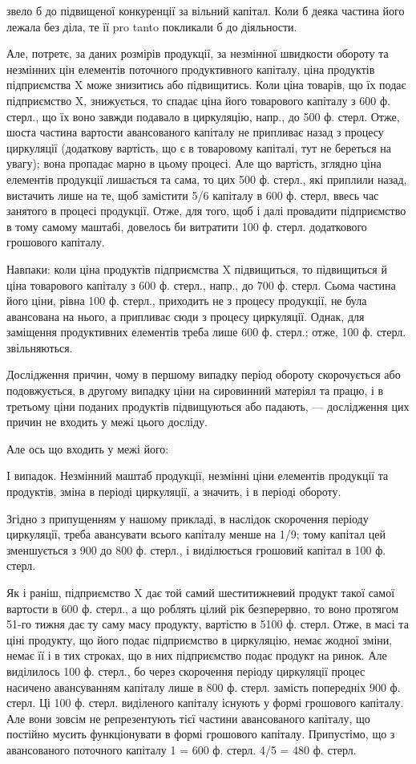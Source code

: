 звело б до підвищеної конкуренції за вільний капітал. Коли б деяка частина
його лежала без діла, те її pro tanto покликали б до діяльности.

Але, потретє, за даних розмірів продукції, за незмінної швидкости
обороту та незмінних цін елементів поточного продуктивного капіталу,
ціна продуктів підприємства X може знизитись або підвищитись. Коли
ціна товарів, що їх подає підприємство X, знижується, то спадає ціна
його товарового капіталу з 600 ф. стерл., що їх воно завжди подавало
в циркуляцію, напр., до 500 ф. стерл. Отже, шоста частина вартости авансованого
капіталу не припливає назад з процесу циркуляції (додаткову вартість,
що є в товаровому капіталі, тут не береться на увагу); вона пропадає
марно в цьому процесі. Але що вартість, зглядно ціна елементів продукції
лишається та сама, то цих 500 ф. стерл., які приплили назад, вистачить
лише на те, щоб замістити 5/6 капіталу в 600 ф. стерл, ввесь час
занятого в процесі продукції. Отже, для того, щоб і далі провадити підприємство
в тому самому маштабі, довелось би витратити 100 ф. стерл.
додаткового грошового капіталу.

Навпаки: коли ціна продуктів підприємства X підвищиться, то підвищиться
й ціна товарового капіталу з 600 ф. стерл., напр., до 700 ф.
стерл. Сьома частина його ціни, рівна 100 ф. стерл., приходить не з
процесу продукції, не була авансована на нього, а припливає сюди з
процесу циркуляції. Однак, для заміщення продуктивних елементів треба
лише 600 ф. стерл.; отже, 100 ф. стерл. звільняються.

Дослідження причин, чому в першому випадку період обороту
скорочується або подовжується, в другому випадку ціни на сировинний
матеріял та працю, і в третьому ціни поданих продуктів підвищуються
або падають, — дослідження цих причин не входить у межі цього досліду.

Але ось що входить у межі його:

I випадок. Незмінний маштаб продукції, незмінні ціни елементів
продукції та продуктів, зміна в періоді циркуляції, а значить, і в періоді
обороту.

Згідно з припущенням у нашому прикладі, в наслідок скорочення періоду
циркуляції, треба авансувати всього капіталу менше на 1/9; тому
капітал цей зменшується з 900 до 800 ф. стерл., і виділюється грошовий
капітал в 100 ф. стерл.

Як і раніш, підприємство X дає той самий шеститижневий продукт такої
самої вартости в 600 ф. стерл., а що роблять цілий рік безперервно, то
воно протягом 51-го тижня дає ту саму масу продукту, вартістю в 5100 ф.
стерл. Отже, в масі та ціні продукту, що його подає підприємство в
циркуляцію, немає жодної зміни, немає її і в тих строках, що в них підприємство
подає продукт на ринок. Але виділилось 100 ф. стерл., бо
через скорочення періоду циркуляції процес насичено авансуванням капіталу
лише в 800 ф. стерл. замість попередніх 900 ф. стерл. Ці 100 ф.
стерл. виділеного капіталу існують у формі грошового капіталу. Але вони
зовсім не репрезентують тієї частини авансованого капіталу, що постійно
мусить функціонувати в формі грошового капіталу. Припустімо, що з
авансованого поточного капіталу 1 = 600 ф. стерл. 4/5 = 480 ф. стерл.
